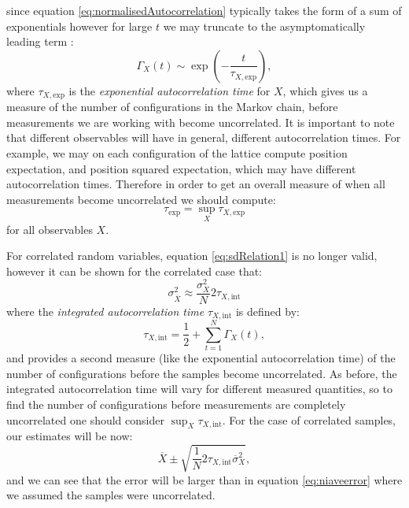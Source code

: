 \documentclass[12pt]{article}
\begin{document}
            since equation \ref{eq:normalisedAutocorrelation} typically takes the form of a sum of exponentials however for  large $t$  we may truncate to the asymptomatically leading term \cite{gattringer_lang_2013}:
            \begin{equation}
                \Gamma_{X}\left(t\right)\sim\exp\left(-\frac{t}{\tau_{X,\text{exp}}}\right),
            \end{equation}
            where $\tau_{X,\text{exp}}$ is the \textit{exponential autocorrelation time} for $X$, which gives us a measure of the number of configurations in the Markov chain, before measurements we are working with become uncorrelated. It is important to note that different observables will have in general, different autocorrelation times. For example, we may on each configuration of the lattice compute position expectation, and position squared expectation, which may have different autocorrelation times. Therefore in order to get an overall measure of when all measurements become uncorrelated we should compute:
            \begin{equation}
                \tau_{\text{exp}}=\sup_{X} \tau_{X,\text{exp}}
            \end{equation}
            for all observables $X$.

            For correlated random variables, equation \ref{eq:sdRelation1} is no longer valid, however it can be shown for the correlated case \cite{gattringer_lang_2013} that:
            \begin{equation}
                \sigma_{\overline{X}}^2 \approx \frac{\sigma_X^2}{N} 2 \tau_{X,\text{int}}
            \end{equation}
            where the \textit{integrated autocorrelation time} $\tau_{X,\text{int}}$ is defined by:
            \begin{equation}
                \label{eq:integratedAutocorrelation}
                \tau_{X,\text{int}} = \frac{1}{2} + \sum_{t=1}^{N}\Gamma_{X}\left(t\right),
            \end{equation}
            and provides  a second measure (like the exponential autocorrelation time) of the number of configurations before the samples become uncorrelated. As before, the integrated autocorrelation time will vary for different measured quantities, so to find the number of configurations before measurements are completely uncorrelated one should consider $\sup_X{\tau_{X,\text{int}}}$. 
            For the case of correlated samples, our estimates will be now:
            \begin{equation}
                \label{eq:trueEstimate}
                \overline{X}\pm\sqrt{\frac{1}{N}2\tau_{X,\text{int}}\overline{\sigma}^{2}_{X}},
            \end{equation}
            and we can see that the error will be larger than in equation \ref{eq:niaveerror} where we assumed the samples were uncorrelated. 
\end{document}
